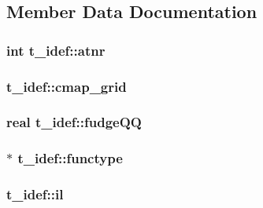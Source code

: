 \subsection{\-Member \-Data \-Documentation}
\hypertarget{structt__idef_ac0de032c9fe33bc65755c359d7724d71}{
\subsubsection[{atnr}]{\setlength{\rightskip}{0pt plus 5cm}int {\bf t\-\_\-idef\-::atnr}}}\label{structt__idef_ac0de032c9fe33bc65755c359d7724d71}
\hypertarget{structt__idef_a6dbf1ff8b2e89d14db052b7108f1a31a}{
\subsubsection[{cmap\-\_\-grid}]{ {\bf t\-\_\-idef\-::cmap\-\_\-grid}}}\label{structt__idef_a6dbf1ff8b2e89d14db052b7108f1a31a}
\hypertarget{structt__idef_a48f83a21c84e6e72037eb6819fcbe7ed}{
\subsubsection[{fudge\-Q\-Q}]{\setlength{\rightskip}{0pt plus 5cm}real {\bf t\-\_\-idef\-::fudge\-Q\-Q}}}\label{structt__idef_a48f83a21c84e6e72037eb6819fcbe7ed}
\hypertarget{structt__idef_a785c235c717f68948b955ba78ca30a64}{
\subsubsection[{functype}]{ $\ast$ {\bf t\-\_\-idef\-::functype}}}\label{structt__idef_a785c235c717f68948b955ba78ca30a64}
\hypertarget{structt__idef_aedcd0c305ab397c2b6fc75eb66b3b97c}{
\subsubsection[{il}]{ {\bf t\-\_\-idef\-::il}}}\label{structt__idef_aedcd0c305ab397c2b6fc75eb66b3b97c}
